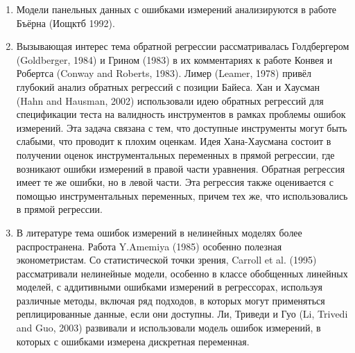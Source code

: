 \begin{enumerate}
\item Модели панельных данных с ошибками измерений анализируются в работе Бъёрна (Иощктб 1992).
\item Вызывающая интерес тема обратной регрессии рассматривалась Голдбергером (Goldberger, 1984) и Грином (1983) в их комментариях к работе Конвея и Робертса (Conway and Roberts, 1983). Лимер (Leamer, 1978) привёл глубокий анализ обратных регрессий с позиции Байеса. Хан и Хаусман (Hahn and Hausman, 2002) использовали идею обратных регрессий для спецификации теста на валидность инструментов в рамках проблемы ошибок измерений. Эта задача связана с тем, что доступные инструменты могут быть слабыми, что проводит к плохим оценкам. Идея Хана-Хаусмана состоит в получении оценок инструментальных переменных в прямой регрессии, где возникают ошибки измерений в правой части уравнения. Обратная регрессия имеет те же ошибки, но в левой части. Эта регрессия также оценивается с помощью инструментальных переменных, причем тех же, что использовались в прямой регрессии.
\item В литературе тема ошибок измерений в нелинейных моделях более распространена. Работа Y.Amemiya (1985) особенно полезная эконометристам. Со статистической точки зрения, Carroll et al. (1995) рассматривали нелинейные модели, особенно в классе обобщенных линейных моделей, с аддитивными ошибками измерений в регрессорах, используя различные методы, включая ряд подходов, в которых могут применяться реплицированные данные, если они доступны. Ли, Триведи и Гуо (Li, Trivedi and Guo, 2003) развивали и использовали модель ошибок измерений, в которых с ошибками измерена дискретная переменная.
\end{enumerate}


